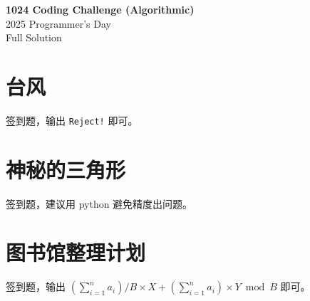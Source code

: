 \documentclass[14pt,a4paper]{article}
\begin{document}
\vspace*{\fill}
\begin{center}
  {\Huge \bfseries 1024 Coding Challenge (Algorithmic)}\\[1em]
  { \Large 2025 Programmer's Day }\\[1em]
  { \Large Full Solution}\\[1em]
\end{center}
\vspace*{\fill}
\clearpage

\section{台风}
签到题，输出 \texttt{Reject!} 即可。

\section{神秘的三角形}
签到题，建议用 python 避免精度出问题。

\section{图书馆整理计划}
签到题，输出 $\left(\sum_{i=1}^{n} a_i\right)/B\times X + \left(\sum_{i=1}^{n} a_i\right) \times Y \bmod B $ 即可。
\end{document}
